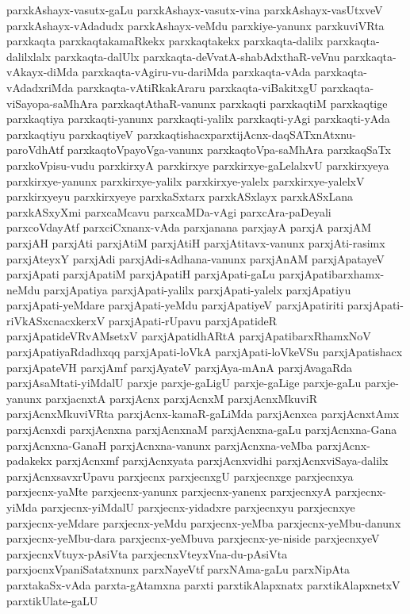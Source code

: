 {parxkAshayx-vasutx-gaLu
parxkAshayx-vasutx-vina
parxkAshayx-vasUtxveV
parxkAshayx-vAdadudx
parxkAshayx-veMdu
parxkiye-yanunx
parxkuviVRta
parxkaqta
parxkaqtakamaRkekx
parxkaqtakekx
parxkaqta-dalilx
parxkaqta-dalilxlalx
parxkaqta-dalUlx
parxkaqta-deVvatA-shabAdxthaR-veVnu
parxkaqta-vAkayx-diMda
parxkaqta-vAgiru-vu-dariMda
parxkaqta-vAda
parxkaqta-vAdadxriMda
parxkaqta-vAtiRkakAraru
parxkaqta-viBakitxgU
parxkaqta-viSayopa-saMhAra
parxkaqtAthaR-vanunx
parxkaqti
parxkaqtiM
parxkaqtige
parxkaqtiya
parxkaqti-yanunx
parxkaqti-yalilx
parxkaqti-yAgi
parxkaqti-yAda
parxkaqtiyu
parxkaqtiyeV
parxkaqtishacxparxtijAcnx-daqSATxnAtxnu-paroVdhAtf
parxkaqtoVpayoVga-vanunx
parxkaqtoVpa-saMhAra
parxkaqSaTx
parxkoVpisu-vudu
parxkirxyA
parxkirxye
parxkirxye-gaLelalxvU
parxkirxyeya
parxkirxye-yanunx
parxkirxye-yalilx
parxkirxye-yalelx
parxkirxye-yalelxV
parxkirxyeyu
parxkirxyeye
parxkaSxtarx
parxkASxlayx
parxkASxLana
parxkASxyXmi
parxcaMcavu
parxcaMDa-vAgi
parxcAra-paDeyali
parxcoVdayAtf
parxciCxnanx-vAda
parxjanana
parxjayA
parxjA
parxjAM
parxjAH
parxjAti
parxjAtiM
parxjAtiH
parxjAtitavx-vanunx
parxjAti-rasimx
parxjAteyxY
parxjAdi
parxjAdi-sAdhana-vanunx
parxjAnAM
parxjApatayeV
parxjApati
parxjApatiM
parxjApatiH
parxjApati-gaLu
parxjApatibarxhamx-neMdu
parxjApatiya
parxjApati-yalilx
parxjApati-yalelx
parxjApatiyu
parxjApati-yeMdare
parxjApati-yeMdu
parxjApatiyeV
parxjApatiriti
parxjApati-riVkASxcnacxkerxV
parxjApati-rUpavu
parxjApatideR
parxjApatideVRvAMsetxV
parxjApatidhARtA
parxjApatibarxRhamxNoV
parxjApatiyaRdadhxqq
parxjApati-loVkA
parxjApati-loVkeVSu
parxjApatishacx
parxjApateVH
parxjAmf
parxjAyateV
parxjAya-mAnA
parxjAvagaRda
parxjAsaMtati-yiMdalU
parxje
parxje-gaLigU
parxje-gaLige
parxje-gaLu
parxje-yanunx
parxjacnxtA
parxjAcnx
parxjAcnxM
parxjAcnxMkuviR
parxjAcnxMkuviVRta
parxjAcnx-kamaR-gaLiMda
parxjAcnxca
parxjAcnxtAmx
parxjAcnxdi
parxjAcnxna
parxjAcnxnaM
parxjAcnxna-gaLu
parxjAcnxna-Gana
parxjAcnxna-GanaH
parxjAcnxna-vanunx
parxjAcnxna-veMba
parxjAcnx-padakekx
parxjAcnxmf
parxjAcnxyata
parxjAcnxvidhi
parxjAcnxviSaya-dalilx
parxjAcnxsavxrUpavu
parxjecnx
parxjecnxgU
parxjecnxge
parxjecnxya
parxjecnx-yaMte
parxjecnx-yanunx
parxjecnx-yanenx
parxjecnxyA
parxjecnx-yiMda
parxjecnx-yiMdalU
parxjecnx-yidadxre
parxjecnxyu
parxjecnxye
parxjecnx-yeMdare
parxjecnx-yeMdu
parxjecnx-yeMba
parxjecnx-yeMbu-danunx
parxjecnx-yeMbu-dara
parxjecnx-yeMbuva
parxjecnx-ye-niside
parxjecnxyeV
parxjecnxVtuyx-pAsiVta
parxjecnxVteyxVna-du-pAsiVta
parxjocnxVpaniSatatxnunx
parxNayeVtf
parxNAma-gaLu
parxNipAta
parxtakaSx-vAda
parxta-gAtamxna
parxti
parxtikAlapxnatx
parxtikAlapxnetxV
parxtikUlate-gaLU
}
